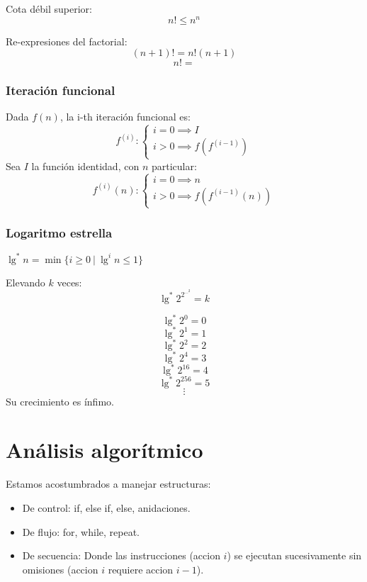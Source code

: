 \documentclass[tikz,11pt,fleqn]{book} %
\begin{document}
\begin{fact}
	Cota débil superior:
	$$n!\le n^n$$
\end{fact}

Re-expresiones del factorial:
$$ (n+1)!=n!(n+1) $$
$$ n! =  $$

\subsection{Iteración funcional}
Dada $f(n)$, la i-th iteración funcional es:
$$f^{(i)}:
	\begin{cases}
		i=0\implies I \\
		i>0\implies f(f^{(i-1)})
	\end{cases}$$
Sea $I$ la función identidad, con $n$ particular:
$$f^{(i)}(n):
	\begin{cases}
		i=0\implies n \\
		i>0\implies f(f^{(i-1)}(n))
	\end{cases}$$

\subsection{Logaritmo estrella}
\begin{definition}
	$\lg^*n=\min\{i\ge0~|~\lg^{i}n\le1\}$

	Elevando $k$ veces:
	$$ \lg^*2^{2^{\cdots^{2}}}=k $$
\end{definition}
\begin{fact}[Crecimiento]
	$$ \lg^*2^0=0 $$
	$$ \lg^*2^1=1 $$
	$$ \lg^*2^2=2 $$
	$$ \lg^*2^4=3 $$
	$$ \lg^*2^{16}=4 $$
	$$ \lg^*2^{256}=5 $$
	$$ \vdots $$
	Su crecimiento es ínfimo.
\end{fact}


\chapter{Análisis algorítmico}

Estamos acostumbrados a manejar estructuras:
\begin{itemize}
	\item De control: if, else if, else, anidaciones.
	\item De flujo: for, while, repeat.
	\item De secuencia: Donde las instrucciones (accion $i$) se ejecutan sucesivamente sin omisiones (accion $i$ requiere accion $i-1$).
\end{itemize}
\end{document}
